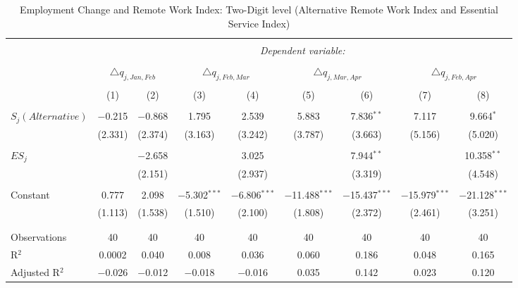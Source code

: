 
\begin{table}[!htbp] \centering 
  \caption{Employment Change and Remote Work Index: Two-Digit level (Alternative Remote Work Index and Essential Service Index)} 
  \label{tab:regression_dynamics_2digit_alternative_robustness_essential_service} 
\footnotesize 
\begin{tabular}{@{\extracolsep{5pt}}lcccccccc} 
\\[-1.8ex]\hline 
\hline \\[-1.8ex] 
 & \multicolumn{8}{c}{\textit{Dependent variable:}} \\ 
\cline{2-9} 
\\[-1.8ex] & \multicolumn{2}{c}{$\triangle q_{j,Jan,Feb}$} & \multicolumn{2}{c}{$\triangle q_{j,Feb,Mar}$} & \multicolumn{2}{c}{$\triangle q_{j,Mar,Apr}$} & \multicolumn{2}{c}{$\triangle q_{j,Feb,Apr}$} \\ 
\\[-1.8ex] & (1) & (2) & (3) & (4) & (5) & (6) & (7) & (8)\\ 
\hline \\[-1.8ex] 
 $S_{j} (Alternative)$ & $-$0.215 & $-$0.868 & 1.795 & 2.539 & 5.883 & 7.836$^{**}$ & 7.117 & 9.664$^{*}$ \\ 
  & (2.331) & (2.374) & (3.163) & (3.242) & (3.787) & (3.663) & (5.156) & (5.020) \\ 
  & & & & & & & & \\ 
 $ES_{j}$ &  & $-$2.658 &  & 3.025 &  & 7.944$^{**}$ &  & 10.358$^{**}$ \\ 
  &  & (2.151) &  & (2.937) &  & (3.319) &  & (4.548) \\ 
  & & & & & & & & \\ 
 Constant & 0.777 & 2.098 & $-$5.302$^{***}$ & $-$6.806$^{***}$ & $-$11.488$^{***}$ & $-$15.437$^{***}$ & $-$15.979$^{***}$ & $-$21.128$^{***}$ \\ 
  & (1.113) & (1.538) & (1.510) & (2.100) & (1.808) & (2.372) & (2.461) & (3.251) \\ 
  & & & & & & & & \\ 
\hline \\[-1.8ex] 
Observations & 40 & 40 & 40 & 40 & 40 & 40 & 40 & 40 \\ 
R$^{2}$ & 0.0002 & 0.040 & 0.008 & 0.036 & 0.060 & 0.186 & 0.048 & 0.165 \\ 
Adjusted R$^{2}$ & $-$0.026 & $-$0.012 & $-$0.018 & $-$0.016 & 0.035 & 0.142 & 0.023 & 0.120 \\ 

\end{tabular}
\end{table}
